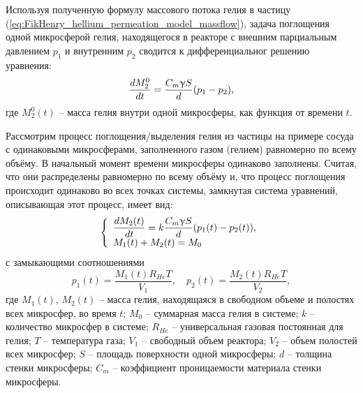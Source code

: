 Используя полученную формулу массового потока гелия в частицу  (\ref{eq:FikHenry_hellium_permeation_model_massflow}), задача поглощения одной микросферой гелия, находящегося в реакторе с внешним парциальным давлением $p_1$ и внутренним $p_2$ сводится к дифференциальног решению уравнения:
\begin{equation}
\label{eq:one_particle_permiation}
\frac{dM^0_2}{dt}= \frac{C_m\upgamma S}{d}(p_1-p_2),
\end{equation}
где $M^0_2(t)$ -- масса гелия внутри одной микросферы, как функция от времени $t$. 
%

Рассмотрим процесс поглощения/выделения гелия из частицы на примере сосуда с одинаковыми микросферами, заполненного газом (гелием) равномерно по всему объёму. В начальный момент времени микросферы одинаково заполнены.  Считая, что они распределены равномерно по всему объёму и, что процесс поглощения происходит одинаково во всех точках системы, замкнутая система уравнений, описывающая этот процесс, имеет вид:
\begin{equation}
\left\{
\begin{array}{l}
\label{eq:permeation_even_laws}
\displaystyle\frac{dM_2(t)}{dt}= k\frac{C_m\upgamma S}{d}(p_1(t)-p_2(t)), \\
M_1(t)+M_2(t)=M_0
\end{array}
\right.
\end{equation}
с замыкающими соотношениями
\begin{equation}
\label{eq:permeation_even_laws_relations}
\displaystyle p_1(t) = \frac{M_1(t)R_{He}T}{V_1},\quad p_2(t)=\frac{M_2(t)R_{He}T}{V_2},
\end{equation}
где  $M_1(t)$, $M_2(t)$ -- масса гелия, находящаяся в свободном объеме и полостях всех микросфер, во время $t$; $M_0$ -- суммарная масса гелия в системе; $k$ -- количество микросфер в системе; $R_{He}$ -- универсальная газовая постоянная для гелия; $T$ -- температура газа; $V_1$ -- свободный объем реактора; $V_2$ -- объем  полостей всех микросфер; $S$ -- площадь поверхности одной микросферы; $d$ -- толщина стенки микросферы; $C_m$ -- коэффициент проницаемости материала стенки микросферы. 

